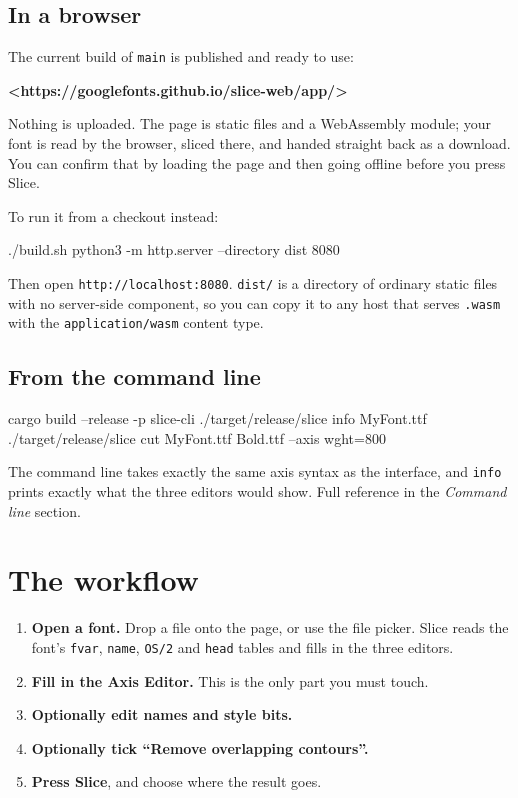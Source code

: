 \documentclass[11pt,a4paper]{article}
\begin{document}
\subsection{In a browser}

The current build of \texttt{main} is published and ready to use:

\textbf{<https://googlefonts.github.io/slice-web/app/>}

Nothing is uploaded. The page is static files and a WebAssembly module; your font is read by the browser, sliced there, and handed straight back as a download. You can confirm that by loading the page and then going offline before you press Slice.

To run it from a checkout instead:

\begin{code}
./build.sh
python3 -m http.server --directory dist 8080
\end{code}

Then open \texttt{http://localhost:8080}. \texttt{dist/} is a directory of ordinary static files with no server-side component, so you can copy it to any host that serves \texttt{.wasm} with the \texttt{application/wasm} content type.

\subsection{From the command line}

\begin{code}
cargo build --release -p slice-cli
./target/release/slice info MyFont.ttf
./target/release/slice cut MyFont.ttf Bold.ttf --axis wght=800
\end{code}

The command line takes exactly the same axis syntax as the interface, and \texttt{info} prints exactly what the three editors would show. Full reference in the \emph{Command line} section.

\section{The workflow}

\begin{enumerate}
  \item \textbf{Open a font.} Drop a file onto the page, or use the file picker. Slice reads the font's \texttt{fvar}, \texttt{name}, \texttt{OS/2} and \texttt{head} tables and fills in the three editors.
  \item \textbf{Fill in the Axis Editor.} This is the only part you must touch.
  \item \textbf{Optionally edit names and style bits.}
  \item \textbf{Optionally tick ``Remove overlapping contours''.}
  \item \textbf{Press Slice}, and choose where the result goes.
\end{enumerate}
\end{document}
